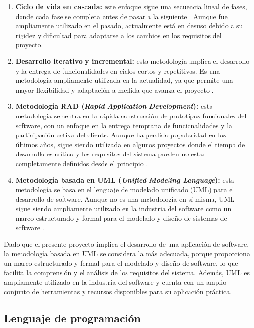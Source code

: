 \begin{enumerate}
    \item \textbf{Ciclo de vida en cascada:} este enfoque sigue una secuencia lineal de fases, donde cada fase se completa antes de pasar a la siguiente \cite{pressman}. Aunque fue ampliamente utilizado en el pasado, actualmente está en desuso debido a su rigidez y dificultad para adaptarse a los cambios en los requisitos del proyecto.
    
    \item \textbf{Desarrollo iterativo y incremental:} esta metodología implica el desarrollo y la entrega de funcionalidades en ciclos cortos y repetitivos. Es una metodología ampliamente utilizada en la actualidad, ya que permite una mayor flexibilidad y adaptación a medida que avanza el proyecto \cite{scrum}.
    
    \item \textbf{Metodología RAD (\textit{Rapid Application Development}):} esta metodología se centra en la rápida construcción de prototipos funcionales del software, con un enfoque en la entrega temprana de funcionalidades y la participación activa del cliente. Aunque ha perdido popularidad en los últimos años, sigue siendo utilizada en algunos proyectos donde el tiempo de desarrollo es crítico y los requisitos del sistema pueden no estar completamente definidos desde el principio \cite{rad}.

    \item \textbf{Metodología basada en UML (\textit{Unified Modeling Language}):} esta metodología se basa en el lenguaje de modelado unificado (UML) para el desarrollo de software. Aunque no es una metodología en sí misma, UML sigue siendo ampliamente utilizado en la industria del software como un marco estructurado y formal para el modelado y diseño de sistemas de software \cite{uml}.
\end{enumerate}

Dado que el presente proyecto implica el desarrollo de una aplicación de software, la metodología basada en UML \cite{uml}  se considera la más adecuada, porque proporciona un marco estructurado y formal para el modelado y diseño de software, lo que facilita la comprensión y el análisis de los requisitos del sistema. Además, UML es ampliamente utilizado en la industria del software y cuenta con un amplio conjunto de herramientas y recursos disponibles para su aplicación práctica.



\subsection{Lenguaje de programación}\label{sec:bases-de-datos}

